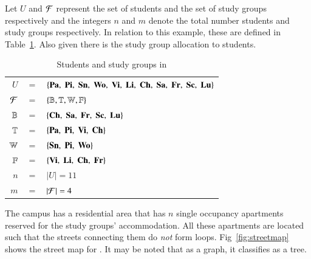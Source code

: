 \documentclass[MS,synopsis]{iitmdiss}
\def \figtabsize {\footnotesize}
\begin{document}
Let $U$ and ${\cal F}$ represent the set of students and the set of study
groups respectively and the integers $n$ and $m$ denote the total
number students and study groups respectively. In relation to this
example, these are defined in Table~\ref{tab:wsigroups}. Also given
there is the study group allocation to students.



\begin{table}[htbp]
  \centering
{
  \begin{tabular}{rcl}
    $U $&$=$&$ \{{\bf Pa},\; {\bf Pi},\; {\bf Sn},\; {\bf Wo},\; {\bf Vi},\; {\bf Li},\; {\bf Ch},\;
    {\bf Sa},\; {\bf Fr},\; {\bf Sc},\; {\bf Lu}\}$\\
    ${\cal F} $&$=$&$ \{\mathbb{B}, \mathbb{T}, \mathbb{W}, \mathbb{F}\}$\\
    $\mathbb{B} $&$=$&$ \{{\bf Ch},\;  {\bf Sa},\;  {\bf Fr},\;  {\bf Sc},\;  {\bf Lu} \}$\\
    $\mathbb{T} $&$=$&$ \{{\bf Pa},\;  {\bf Pi},\;  {\bf Vi},\;  {\bf Ch} \}$\\
    $\mathbb{W} $&$=$&$ \{{\bf Sn},\;  {\bf Pi},\;  {\bf Wo} \}$\\
    $\mathbb{F} $&$=$&$ \{{\bf Vi},\;  {\bf Li},\;  {\bf Ch},\;  {\bf Fr} \}$\\
    $n $&$=$&$ |U| = 11$\\
    $m $&$=$&$ |{\cal F}| = 4$      
  \end{tabular}
}
  \caption{\figtabsize Students and study groups in \WSI}
  \label{tab:wsigroups}
\end{table}

The campus has a residential area {\residenceblock} that has $n$
single occupancy apartments reserved for the study groups'
accommodation.  All these apartments are located such that the streets
connecting them do {\em not} form loops. Fig~\ref{fig:streetmap} shows
the street map for {\residenceblock}. It may be noted that as a graph,
it classifies as a tree.
\end{document}
